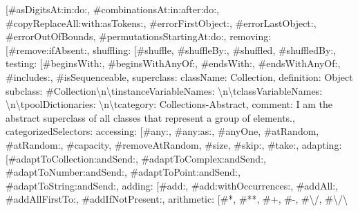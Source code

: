 {{[}\textquotedbl{}\#asDigitsAt:in:do:\textquotedbl{}, \textquotedbl{}\#combinationsAt:in:after:do:\textquotedbl{}, \textquotedbl{}\#copyReplaceAll:with:asTokens:\textquotedbl{}, \textquotedbl{}\#errorFirstObject:\textquotedbl{}, \textquotedbl{}\#errorLastObject:\textquotedbl{}, \textquotedbl{}\#errorOutOfBounds\textquotedbl{}, \textquotedbl{}\#permutationsStartingAt:do:\textquotedbl{}{]}, \textquotedbl{}removing\textquotedbl{}: {[}\textquotedbl{}\#remove:ifAbsent:\textquotedbl{}{]}, \textquotedbl{}shuffling\textquotedbl{}: {[}\textquotedbl{}\#shuffle\textquotedbl{}, \textquotedbl{}\#shuffleBy:\textquotedbl{}, \textquotedbl{}\#shuffled\textquotedbl{}, \textquotedbl{}\#shuffledBy:\textquotedbl{}{]}, \textquotedbl{}testing\textquotedbl{}: {[}\textquotedbl{}\#beginsWith:\textquotedbl{}, \textquotedbl{}\#beginsWithAnyOf:\textquotedbl{}, \textquotedbl{}\#endsWith:\textquotedbl{}, \textquotedbl{}\#endsWithAnyOf:\textquotedbl{}, \textquotedbl{}\#includes:\textquotedbl{}, \textquotedbl{}\#isSequenceable\textquotedbl{}{]}\textbraceright , \textquotedbl{}superclass\textquotedbl{}: \textbraceleft \textquotedbl{}className\textquotedbl{}: \textquotedbl{}Collection\textquotedbl{}, \textquotedbl{}definition\textquotedbl{}: \textquotedbl{}Object subclass: \#Collection\allowbreak\textbackslash n\allowbreak\textbackslash tinstanceVariableNames: \textquotesingle{}\textquotesingle{}\allowbreak\textbackslash n\allowbreak\textbackslash tclassVariableNames: \textquotesingle{}\textquotesingle{}\allowbreak\textbackslash n\allowbreak\textbackslash tpoolDictionaries: \textquotesingle{}\textquotesingle{}\allowbreak\textbackslash n\allowbreak\textbackslash tcategory: \textquotesingle{}Collections-Abstract\textquotesingle{}\textquotedbl{}, \textquotedbl{}comment\textquotedbl{}: \textquotedbl{}I am the abstract superclass of all classes that represent a group of elements.\textquotedbl{}, \textquotedbl{}categorizedSelectors\textquotedbl{}: \textbraceleft \textquotedbl{}accessing\textquotedbl{}: {[}\textquotedbl{}\#any:\textquotedbl{}, \textquotedbl{}\#any:as:\textquotedbl{}, \textquotedbl{}\#anyOne\textquotedbl{}, \textquotedbl{}\#atRandom\textquotedbl{}, \textquotedbl{}\#atRandom:\textquotedbl{}, \textquotedbl{}\#capacity\textquotedbl{}, \textquotedbl{}\#removeAtRandom\textquotedbl{}, \textquotedbl{}\#size\textquotedbl{}, \textquotedbl{}\#skip:\textquotedbl{}, \textquotedbl{}\#take:\textquotedbl{}{]}, \textquotedbl{}adapting\textquotedbl{}: {[}\textquotedbl{}\#adaptToCollection:andSend:\textquotedbl{}, \textquotedbl{}\#adaptToComplex:andSend:\textquotedbl{}, \textquotedbl{}\#adaptToNumber:andSend:\textquotedbl{}, \textquotedbl{}\#adaptToPoint:andSend:\textquotedbl{}, \textquotedbl{}\#adaptToString:andSend:\textquotedbl{}{]}, \textquotedbl{}adding\textquotedbl{}: {[}\textquotedbl{}\#add:\textquotedbl{}, \textquotedbl{}\#add:withOccurrences:\textquotedbl{}, \textquotedbl{}\#addAll:\textquotedbl{}, \textquotedbl{}\#addAllFirstTo:\textquotedbl{}, \textquotedbl{}\#addIfNotPresent:\textquotedbl{}{]}, \textquotedbl{}arithmetic\textquotedbl{}: {[}\textquotedbl{}\#*\textquotedbl{}, \textquotedbl{}\#**\textquotedbl{}, \textquotedbl{}\#+\textquotedbl{}, \textquotedbl{}\#-\textquotedbl{}, \textquotedbl{}\#\allowbreak\textbackslash /\textquotedbl{}, \textquotedbl{}\#\allowbreak\textbackslash /\allowbreak\textbackslash }
